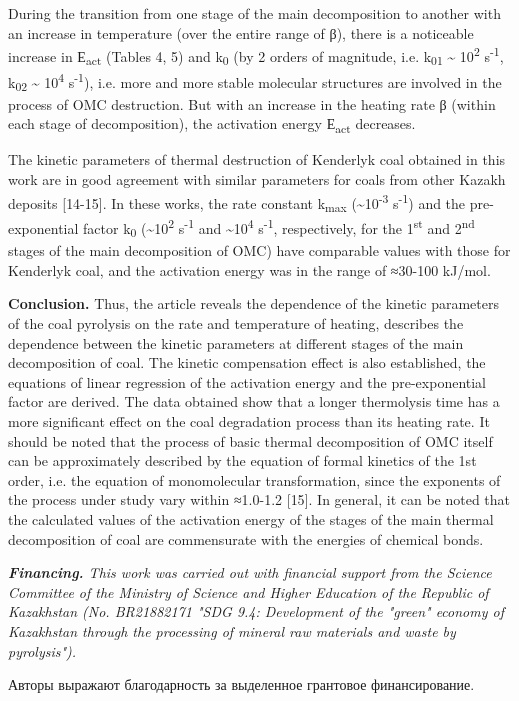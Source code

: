 \begin{multicols}{2}
During the transition from one stage of the main decomposition to
another with an increase in temperature (over the entire range of β),
there is a noticeable increase in Е\textsubscript{act} (Tables 4, 5) and
k\textsubscript{0} (by 2 orders of magnitude, i.e. k\textsubscript{01}
\textasciitilde{} 10\textsuperscript{2} s\textsuperscript{-1},
k\textsubscript{02} \textasciitilde{} 10\textsuperscript{4}
s\textsuperscript{-1}), i.e. more and more stable molecular structures
are involved in the process of OMC destruction. But with an increase in
the heating rate β (within each stage of decomposition), the activation
energy Е\textsubscript{act} decreases.

The kinetic parameters of thermal destruction of Kenderlyk coal obtained
in this work are in good agreement with similar parameters for coals
from other Kazakh deposits {[}14-15{]}. In these works, the rate
constant k\textsubscript{max} (\textasciitilde10\textsuperscript{-3}
s\textsuperscript{-1}) and the pre-exponential factor k\textsubscript{0}
(\textasciitilde10\textsuperscript{2} s\textsuperscript{-1} and
\textasciitilde10\textsuperscript{4} s\textsuperscript{-1},
respectively, for the 1\textsuperscript{st} and 2\textsuperscript{nd}
stages of the main decomposition of OMC) have comparable values with
those for Kenderlyk coal, and the activation energy was in the range of
≈30-100 kJ/mol.

{\bfseries Conclusion.} Thus, the article reveals the dependence of the
kinetic parameters of the coal pyrolysis on the rate and temperature of
heating, describes the dependence between the kinetic parameters at
different stages of the main decomposition of coal. The kinetic
compensation effect is also established, the equations of linear
regression of the activation energy and the pre-exponential factor are
derived. The data obtained show that a longer thermolysis time has a
more significant effect on the coal degradation process than its heating
rate. It should be noted that the process of basic thermal decomposition
of OMC itself can be approximately described by the equation of formal
kinetics of the 1st order, i.e. the equation of monomolecular
transformation, since the exponents of the process under study vary
within ≈1.0-1.2 {[}15{]}. In general, it can be noted that the
calculated values of the activation energy of the stages of the main
thermal decomposition of coal are commensurate with the energies of
chemical bonds.

\emph{{\bfseries Financing.} This work was carried out with financial
support from the Science Committee of the Ministry of Science and Higher
Education of the Republic of Kazakhstan (No. BR21882171 "SDG 9.4:
Development of the "green" economy of Kazakhstan through the processing
of mineral raw materials and waste by pyrolysis").}

Авторы выражают благодарность за выделенное грантовое финансирование.
\end{multicols}

